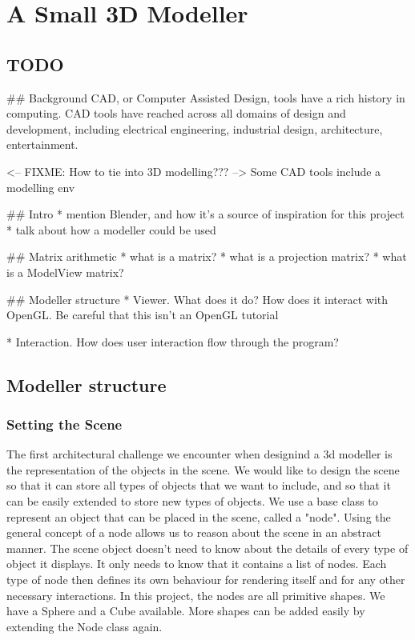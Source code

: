 \documentclass[11pt,draft]{article}
\begin{document}
\section{A Small 3D Modeller}
\lstset{language=Python}

\subsection{TODO}
\#\# Background
CAD, or Computer Assisted Design, tools have a rich history in computing. CAD tools have
reached across all domains of design and development, including electrical engineering, industrial
design, architecture, entertainment.

<-- FIXME: How to tie into 3D modelling??? -->
Some CAD tools include a modelling env

\#\# Intro
 * mention Blender, and how it's a source of inspiration for this project
 * talk about how a modeller could be used

\#\# Matrix arithmetic
 * what is a matrix?
 * what is a projection matrix?
 * what is a ModelView matrix?

\#\# Modeller structure
 * Viewer. What does it do? How does it interact with OpenGL. Be careful that this isn't an OpenGL tutorial

 * Interaction. How does user interaction flow through the program?

\subsection{Modeller structure}

\subsubsection{Setting the Scene}
The first architectural challenge we encounter when designind a 3d modeller is the representation of the objects in the scene.
We would like to design the scene so that it can store all types of objects that we want to include, and so that it can be easily extended to
store new types of objects.
We use a base class to represent an object that can be placed in the scene, called a "node". Using the general concept of a node allows
us to reason about the scene in an abstract manner. The scene object doesn't need to know about the details of every type of object it displays.
It only needs to know that it contains a list of nodes. Each type of node then defines its own behaviour for rendering itself and for any other necessary
interactions.
In this project, the nodes are all primitive shapes. We have a Sphere and a Cube available. More shapes can be added easily by extending the Node class again.
\end{document}
